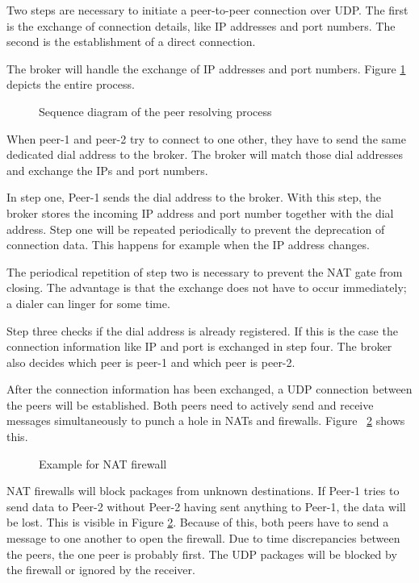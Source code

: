 Two steps are necessary to initiate a peer-to-peer connection over UDP. The first is the exchange of connection details, like IP addresses and port numbers. The second is the establishment of a direct connection. 

The broker will handle the exchange of IP addresses and port numbers. Figure \ref{fig:Sequence-Peer-Resolving} depicts the entire process.

\begin{figure}[h]
  \centering
  
  \caption{Sequence diagram of the peer resolving process}
  \label{fig:Sequence-Peer-Resolving}
\end{figure}

When peer-1 and peer-2 try to connect to one other, they have to send the same dedicated dial address to the broker. The broker will match those dial addresses and exchange the IPs and port numbers. 

In step one, Peer-1 sends the dial address to the broker. With this step, the broker stores the incoming IP address and port number together with the dial address. Step one will be repeated periodically to prevent the deprecation of connection data. This happens for example when the IP address changes.

The periodical repetition of step two is necessary to prevent the NAT gate from closing. The advantage is that the exchange does not have to occur immediately; a dialer can linger for some time.

Step three checks if the dial address is already registered. If this is the case the connection information like IP and port is exchanged in step four. The broker also decides which peer is peer-1 and which peer is peer-2.

After the connection information has been exchanged, a UDP connection between the peers will be established. Both peers need to actively send and receive messages simultaneously to punch a hole in NATs and firewalls. Figure ~\ref{fig:Sequence-NAT-Firewall} shows this.

\begin{figure}[h]
  \centering
  
  \caption{Example for NAT firewall}
  \label{fig:Sequence-NAT-Firewall}
\end{figure}

NAT firewalls will block packages from unknown destinations. If Peer-1 tries to send data to Peer-2 without Peer-2 having sent anything to Peer-1, the data will be lost. This is visible in Figure \ref{fig:Sequence-NAT-Firewall}. Because of this, both peers have to send a message to one another to open the firewall. Due to time discrepancies between the peers, the one peer is probably first. The UDP packages will be blocked by the firewall or ignored by the receiver. 

